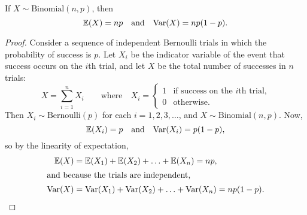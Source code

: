 \begin{lemma}\label{lem:binom-mean-var}
If $X\sim\text{Binomial}(n,p)$, then 
\[
\mathbb{E}(X)= np \quad\text{and}\quad \text{Var}(X) = np(1-p).
\]
\end{lemma}

\begin{proof}
Consider a sequence of independent Bernoulli trials in which the probability of success is $p$. Let $X_i$ be the indicator variable of the event that success occurs on the $i$th trial, and let $X$ be the total number of successes in $n$ trials:
\[
X = \sum_{i=1}^n X_i \qquad\text{where}\quad X_i =
  \begin{cases}
   1 & \text{if success on the $i$th trial,} \\
   0 & \text{otherwise.}
  \end{cases}
\]
Then $X_i\sim\text{Bernoulli}(p)$ for each $i=1,2,3,\ldots$, and $X\sim\text{Binomial}(n,p)$. Now,
\[
\mathbb{E}(X_i) = p \text{\quad and\quad} \text{Var}(X_i)=p(1-p),
\]
so by the linearity of expectation,
\begin{align*}
\mathbb{E}(X) & = \mathbb{E}(X_1)+\mathbb{E}(X_2)+\ldots+\mathbb{E}(X_n) = np, \\
\intertext{and because the trials are independent,}
\text{Var}(X) & = \text{Var}(X_1)+\text{Var}(X_2)+\ldots+\text{Var}(X_n) = np(1-p).
\end{align*}
\end{proof}

